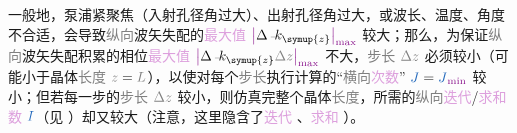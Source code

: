 一般地，\textcolor{NavyBlue}{泵浦}\textcolor{PineGreen}{紧聚焦}（\textcolor{NavyBlue}{入射}\textcolor{PineGreen}{孔径角}过大）、\textcolor{NavyBlue}{出射}\textcolor{PineGreen}{孔径角}过大，或\textcolor{NavyBlue}{波长}、\textcolor{NavyBlue}{温度}、\textcolor{NavyBlue}{角度}不合适，会导致\textcolor{gray}{纵向}\textcolor{PineGreen}{波矢失配}的\textcolor{Plum}{最大值} $\textcolor{Plum}{\left|\textcolor{black}{\Delta \xint{\begin{smallmatrix} ~ \\ {}^{}_{\mathcolor{gray}{-}} \\ ~ \end{smallmatrix}}{15}{k}_{\symup{z}}}\right|_{\max}}$ 较大；那么，为保证\textcolor{gray}{纵向}\textcolor{PineGreen}{波矢失配}积累的\textcolor{NavyBlue}{相位}\textcolor{Plum}{最大值} $\textcolor{Plum}{\left|\textcolor{black}{\Delta \xint{\begin{smallmatrix} ~ \\ {}^{}_{\mathcolor{gray}{-}} \\ ~ \end{smallmatrix}}{15}{k}_{\symup{z}} \mathcolor{gray}{\Delta z}}\right|_{\max}}$ 不大，\textcolor{gray}{步长} $\mathcolor{gray}{\Delta z}$ 必须较小（可能小于\textcolor{PineGreen}{晶体}\textcolor{gray}{长度} $\mathcolor{gray}{z} = \mathcolor{gray}{L}$），以使对每个\textcolor{gray}{步长}执行计算的“\textcolor{gray}{横向}\textcolor{Plum}{次数}” $\textcolor{NavyBlue}{J} = \textcolor{NavyBlue}{J}_{\textcolor{Plum}{\min}}$ 较小；但若每一步的\textcolor{gray}{步长} $\mathcolor{gray}{\Delta z}$ 较小，则仿真完整个\textcolor{PineGreen}{晶体}\textcolor{gray}{长度}，所需的\textcolor{gray}{纵向}\textcolor{Plum}{迭代}/\textcolor{Plum}{求和数} $\textcolor{NavyBlue}{I}$（见 ）却又较大（注意，这里隐含了\textcolor{Plum}{迭代} 、\textcolor{Plum}{求和} ）。

